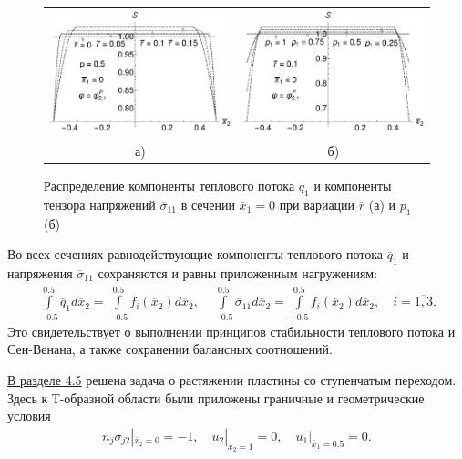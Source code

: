 \begin{figure}[ht] \centering
	\begin{tabular}{cc}
		\includegraphics[width=0.4\linewidth]{pics/HeatFluxStabilityVariationR.pdf} &
		\includegraphics[width=0.4\linewidth]{pics/HeatFluxStabilityVariationP1.pdf} \\
		а) & б)
	\end{tabular}
    \caption{Распределение компоненты теплового потока $\overline{q}_1$ и компоненты тензора напряжений $\overline{\sigma}_{11}$ в сечении $\overline{x}_1 = 0$ при вариации $\overline{r}$ (а) и $p_1$ (б)}
    \label{fig:SaintVenantVariation}
\end{figure}

Во всех сечениях равнодействующие компоненты теплового потока $\overline{q}_1$ и напряжения $\overline{\sigma}_{11}$ сохраняются и равны приложенным нагружениям:
\begin{gather*}
	\int\limits_{-0.5}^{0.5} \overline{q}_1 d\overline{x}_2 = 
	\int\limits_{-0.5}^{0.5} f_i (\overline{x}_2) d\overline{x}_2,
	\quad
	\int\limits_{-0.5}^{0.5} \overline{\sigma}_{11} d\overline{x}_2 = 
	\int\limits_{-0.5}^{0.5} f_i (\overline{x}_2) d\overline{x}_2,
	\quad	
	i = \overline{1,3}.
\end{gather*}
Это свидетельствует о выполнении принципов стабильности теплового потока и Сен-Венана, а также сохранении балансных соотношений.

\underline{В разделе 4.5} решена задача о растяжении пластины со ступенчатым переходом. Здесь к Т-образной области были приложены граничные и геометрические условия
\begin{gather*}
	n_j \overline{\sigma}_{j2} |_{\overline{x}_2 = 0} = -1,
	\quad
	\overline{u}_2 |_{\overline{x}_2 = 1} = 0,
	\quad
	\overline{u}_1 |_{\overline{x}_1 = 0.5} = 0.
\end{gather*}

